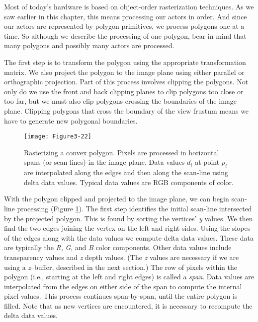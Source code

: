 Most of today's hardware is based on object-order rasterization techniques. As we saw earlier in this chapter, this means processing our actors in order. And since our actors are represented by polygon primitives, we process polygons one at a time. So although we describe the processing of one polygon, bear in mind that many polygons and possibly many actors are processed.

The first step is to transform the polygon using the appropriate transformation matrix. We also project the polygon to the image plane using either parallel or orthographic projection. Part of this process involves clipping the polygons. Not only do we use the front and back clipping planes to clip polygons too close or too far, but we must also clip polygons crossing the boundaries of the image plane. Clipping polygons that cross the boundary of the view frustum means we have to generate new polygonal boundaries.

\begin{figure}[!htb]
  \centering
  \texttt{[image: Figure3-22]}\\
  \caption{Rasterizing a convex polygon. Pixels are processed in horizontal spans (or scan-lines) in the image plane. Data values $d_i$ at point $p_i$ are interpolated along the edges and then along the scan-line using delta data values. Typical data values are RGB components of color.}\label{fig:Figure3-22}
\end{figure}

With the polygon clipped and projected to the image plane, we can begin scan-line processing (Figure \ref{fig:Figure3-22}). The first step identifies the initial scan-line intersected by the projected polygon. This is found by sorting the vertices' \emph{y} values. We then find the two edges joining the vertex on the left and right sides. Using the slopes of the edges along with the data values we compute delta data values. These data are typically the \emph{R}, \emph{G}, and \emph{B} color components. Other data values include transparency values and \emph{z} depth values. (The \emph{z} values are necessary if we are using a \emph{z}--buffer, described in the next section.) The row of pixels within the polygon (i.e., starting at the left and right edges) is called a \emph{span}. Data values are interpolated from the edges on either side of the span to compute the internal pixel values. This process continues span-by-span, until the entire polygon is filled. Note that as new vertices are encountered, it is necessary to recompute the delta data values.

